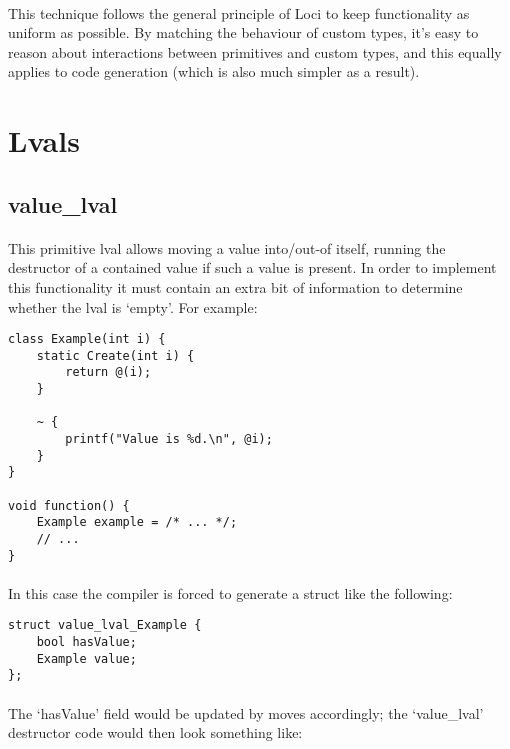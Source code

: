 \documentclass[12pt,twoside,notitlepage]{report}
\begin{document}
\paragraph{}
This technique follows the general principle of Loci to keep functionality as uniform as possible. By matching the behaviour of custom types, it's easy to reason about interactions between primitives and custom types, and this equally applies to code generation (which is also much simpler as a result).

\section{Lvals}

\subsection{value\_lval}

\paragraph{}
This primitive lval allows moving a value into/out-of itself, running the destructor of a contained value if such a value is present. In order to implement this functionality it must contain an extra bit of information to determine whether the lval is `empty'. For example:

\begin{lstlisting}
class Example(int i) {
	static Create(int i) {
		return @(i);
	}
	
	~ {
		printf("Value is %d.\n", @i);
	}
}

void function() {
	Example example = /* ... */;
	// ...
}
\end{lstlisting}

\paragraph{}
In this case the compiler is forced to generate a struct like the following:

\begin{lstlisting}
struct value_lval_Example {
	bool hasValue;
	Example value;
};
\end{lstlisting}

\paragraph{}
The `hasValue' field would be updated by moves accordingly; the `value\_lval' destructor code would then look something like:
\end{document}
